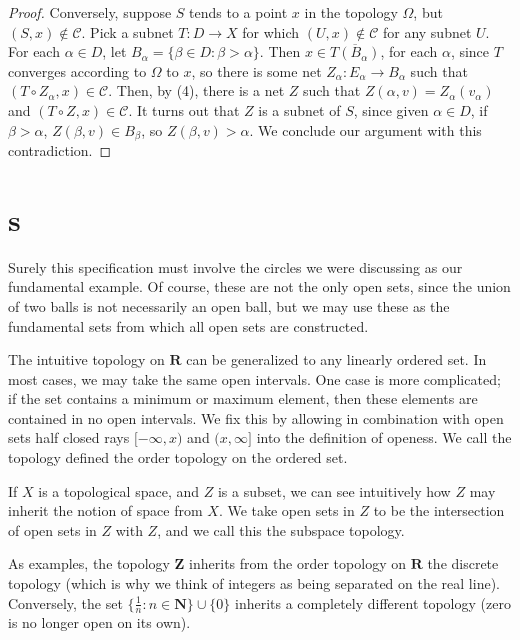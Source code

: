 \begin{proof}
    Conversely, suppose $S$ tends to a point $x$ in the topology $\Omega$, but $(S,x) \not \in \mathcal{C}$. Pick a subnet $T:D \to X$ for which $(U,x) \not \in \mathcal{C}$ for any subnet $U$. For each $\alpha \in D$, let $B_\alpha = \{ \beta \in D : \beta > \alpha \}$. Then $x \in \overline{T(B_\alpha)}$, for each $\alpha$, since $T$ converges according to $\Omega$ to $x$, so there is some net $Z_\alpha : E_\alpha \to B_\alpha$ such that $(T \circ Z_\alpha, x) \in \mathcal{C}$. Then, by (4), there is a net $Z$ such that $Z(\alpha, v) = Z_\alpha(v_\alpha)$ and $(T \circ Z,x) \in \mathcal{C}$. It turns out that $Z$ is a subnet of $S$, since given $\alpha \in D$, if $\beta > \alpha$, $Z(\beta, v) \in B_\beta$, so $Z(\beta, v) > \alpha$. We conclude our argument with this contradiction.
\end{proof}







\section{s}

Surely this specification must involve the circles we were discussing as our fundamental example. Of course, these are not the only open sets, since the union of two balls is not necessarily an open ball, but we may use these as the fundamental sets from which all open sets are constructed.

The intuitive topology on $\mathbf{R}$ can be generalized to any linearly ordered set. In most cases, we may take the same open intervals. One case is more complicated; if the set contains a minimum or maximum element, then these elements are contained in no open intervals. We fix this by allowing in combination with open sets half closed rays $[-\infty, x)$ and $(x, \infty]$ into the definition of openess. We call the topology defined the order topology on the ordered set.

If $X$ is a topological space, and $Z$ is a subset, we can see intuitively how $Z$ may inherit the notion of space from $X$. We take open sets in $Z$ to be the intersection of open sets in $Z$ with $Z$, and we call this the subspace topology.

As examples, the topology $\mathbf{Z}$ inherits from the order topology on $\mathbf{R}$ the discrete topology (which is why we think of integers as being separated on the real line). Conversely, the set $\{ \frac{1}{n}: n \in \mathbf{N} \} \cup \{ 0 \}$ inherits a completely different topology (zero is no longer open on its own).

